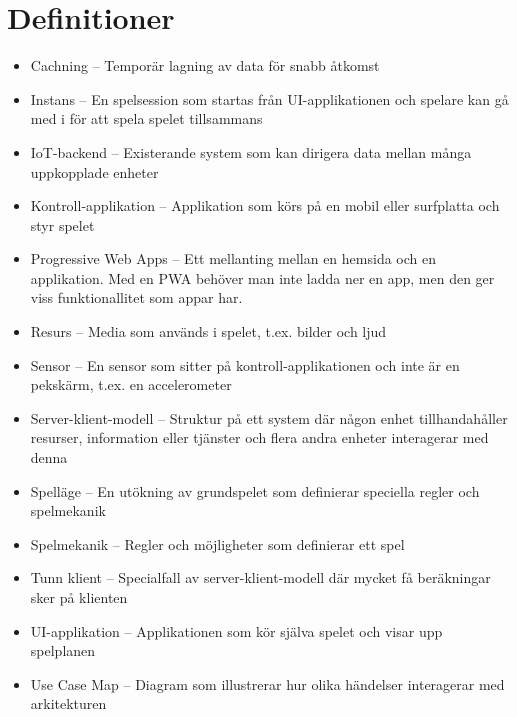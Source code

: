 \section{Definitioner}
\begin{itemize}
  \item Cachning -- Temporär lagning av data för snabb åtkomst
  \item Instans -- En spelsession som startas från UI-applikationen och spelare kan gå med i för att spela spelet tillsammans
  \item IoT-backend -- Existerande system som kan dirigera data mellan många uppkopplade enheter
  \item Kontroll-applikation -- Applikation som körs på en mobil eller surfplatta och styr spelet
  \item Progressive Web Apps -- Ett mellanting mellan en hemsida och en applikation. Med en PWA behöver man inte ladda ner en app, men den ger viss funktionallitet som appar har. \cite{bib-pwa}
  \item Resurs -- Media som används i spelet, t.ex. bilder och ljud
  \item Sensor -- En sensor som sitter på kontroll-applikationen och inte är en pekskärm, t.ex. en accelerometer
  \item Server-klient-modell -- Struktur på ett system där någon enhet tillhandahåller resurser, information eller tjänster och flera andra enheter interagerar med denna
  \item Spelläge -- En utökning av grundspelet som definierar speciella regler och spelmekanik
  \item Spelmekanik -- Regler och möjligheter som definierar ett spel
  \item Tunn klient -- Specialfall av server-klient-modell där mycket få beräkningar sker på klienten
  \item UI-applikation -- Applikationen som kör själva spelet och visar upp spelplanen
  \item Use Case Map -- Diagram som illustrerar hur olika händelser interagerar med arkitekturen \cite[p.~30--33]{bib-architecture-primer}
\end{itemize}
